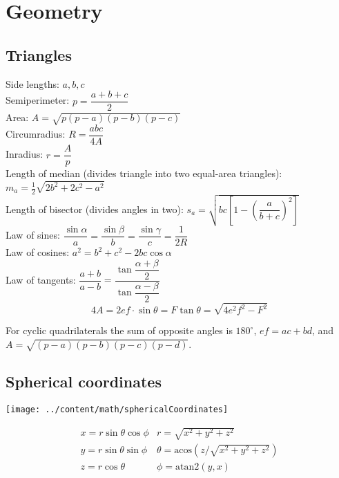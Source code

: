	\section{Geometry}
							
	\subsection{Triangles}
	Side lengths: $a,b,c$\\
	Semiperimeter: $p=\dfrac{a+b+c}{2}$\\
	Area: $A=\sqrt{p(p-a)(p-b)(p-c)}$\\
	Circumradius: $R=\dfrac{abc}{4A}$\\
	Inradius: $r=\dfrac{A}{p}$\\
	Length of median (divides triangle into two equal-area triangles): $m_a=\tfrac{1}{2}\sqrt{2b^2+2c^2-a^2}$\\
	Length of bisector (divides angles in two): $s_a=\sqrt{bc\left[1-\left(\dfrac{a}{b+c}\right)^2\right]}$\\
	Law of sines: $\dfrac{\sin\alpha}{a}=\dfrac{\sin\beta}{b}=\dfrac{\sin\gamma}{c}=\dfrac{1}{2R}$\\
	Law of cosines: $a^2=b^2+c^2-2bc\cos\alpha$\\
	Law of tangents: $\dfrac{a+b}{a-b}=\dfrac{\tan\dfrac{\alpha+\beta}{2}}{\tan\dfrac{\alpha-\beta}{2}}$\\
							
							
	\[ 4A = 2ef \cdot \sin\theta = F\tan\theta = \sqrt{4e^2f^2-F^2} \]
							
	For cyclic quadrilaterals the sum of opposite angles is $180^\circ$,
	$ef = ac + bd$, and $A = \sqrt{(p-a)(p-b)(p-c)(p-d)}$.
							
	\subsection{Spherical coordinates}
	\centerline{\texttt{[image: ../content/math/sphericalCoordinates]}}
	\[\begin{array}{cc}
		x = r\sin\theta\cos\phi & r = \sqrt{x^2+y^2+z^2}\\
		y = r\sin\theta\sin\phi & \theta = \textrm{acos}(z/\sqrt{x^2+y^2+z^2})\\
		z = r\cos\theta & \phi = \textrm{atan2}(y,x)
		\end{array}\]
														

